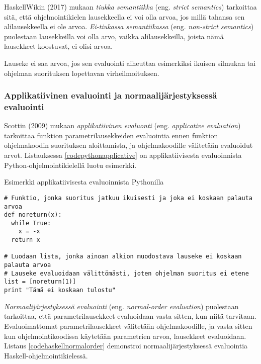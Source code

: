 HaskellWikin (2017) mukaan \textit{tiukka semantiikka} (eng. \textit{strict semantics}) tarkoittaa sitä, että ohjelmointikielen lausekkeella ei voi olla arvoa, jos millä tahansa sen alilausekkeella ei ole arvoa. \textit{Ei-tiukassa semantiikassa} (eng. \textit{non-strict semantics}) puolestaan lausekkeilla voi olla arvo, vaikka alilausekkeilla, joista nämä lausekkeet koostuvat, ei olisi arvoa.

Lauseke ei saa arvoa, jos sen evaluointi aiheuttaa esimerkiksi ikuisen silmukan tai ohjelman suorituksen lopettavan virheilmoituksen.

\subsubsection{Applikatiivinen evaluointi ja normaalijärjestyksessä evaluointi}

Scottin (2009) mukaan \textit{applikatiivinen evaluonti} (eng. \textit{applicative evaluation}) tarkoittaa funktion parametrilausekkeiden evaluointia ennen funktion ohjelmakoodin suorituksen aloittamista, ja ohjelmakoodille välitetään evaluoidut arvot. Listauksessa \ref{codepythonapplicative} on applikatiivisesta evaluoinnista Python-ohjelmointikielellä luotu esimerkki.

\begin{listing}[H]
  \caption{Esimerkki applikatiivisesta evaluoinnista Pythonilla}
  \label{codepythonapplicative}
  \bigskip
  \begin{verbatim}
# Funktio, jonka suoritus jatkuu ikuisesti ja joka ei koskaan palauta arvoa
def noreturn(x):
  while True:
    x = -x
  return x

# Luodaan lista, jonka ainoan alkion muodostava lauseke ei koskaan palauta arvoa
# Lauseke evaluoidaan välittömästi, joten ohjelman suoritus ei etene
list = [noreturn(1)]
print "Tämä ei koskaan tulostu"
  \end{verbatim}
\end{listing}

\textit{Normaalijärjestyksessä evaluointi} (eng. \textit{normal-order evaluation}) puolestaan tarkoittaa, että parametrilausekkeet evaluoidaan vasta sitten, kun niitä tarvitaan. Evaluoimattomat parametrilausekkeet välitetään ohjelmakoodille, ja vasta sitten kun ohjelmointikoodissa käytetään parametrien arvoa, lausekkeet evaluoidaan. Listaus \ref{codehaskellnormalorder} demonstroi normaalijärjestyksessä evaluointia Haskell-ohjelmointikielessä.

